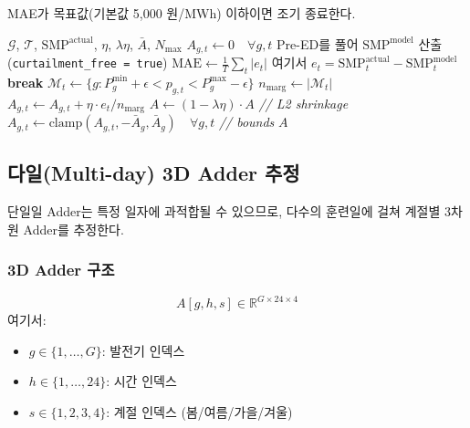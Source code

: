 \documentclass[11pt, a4paper]{article}
\begin{document}
MAE가 목표값(기본값 5,000 원/MWh) 이하이면 조기 종료한다.

\begin{algorithm}[H]
\caption{단일일 Price Adder 추정}\label{alg:single_adder}
\begin{algorithmic}[1]
\REQUIRE $\mathcal{G}$, $\mathcal{T}$, $\text{SMP}^{\text{actual}}$, $\eta$, $\lambda\eta$, $\bar{A}$, $N_{\max}$
\STATE $A_{g,t} \leftarrow 0 \quad \forall g, t$
    \STATE Pre-ED를 풀어 $\text{SMP}^{\text{model}}$ 산출 (\texttt{curtailment\_free = true})
    \STATE $\text{MAE} \leftarrow \frac{1}{T}\sum_t |e_t|$ \quad 여기서 $e_t = \text{SMP}_t^{\text{actual}} - \text{SMP}_t^{\text{model}}$
        \STATE \textbf{break}
    \ENDIF
        \STATE $\mathcal{M}_t \leftarrow \{g : P_g^{\min} + \epsilon < p_{g,t} < P_g^{\max} - \epsilon\}$
        \STATE $n_{\text{marg}} \leftarrow |\mathcal{M}_t|$
                \STATE $A_{g,t} \leftarrow A_{g,t} + \eta \cdot e_t / n_{\text{marg}}$
            \ENDFOR
        \ENDIF
    \ENDFOR
    \STATE $A \leftarrow (1 - \lambda\eta) \cdot A$ \hfill \textit{// L2 shrinkage}
    \STATE $A_{g,t} \leftarrow \text{clamp}(A_{g,t}, -\bar{A}_g, \bar{A}_g) \quad \forall g, t$ \hfill \textit{// bounds}
\ENDFOR
\RETURN $A$
\end{algorithmic}
\end{algorithm}

\subsection{다일(Multi-day) 3D Adder 추정}\label{sec:multi_day_adder}

단일일 Adder는 특정 일자에 과적합될 수 있으므로,
다수의 훈련일에 걸쳐 계절별 3차원 Adder를 추정한다.

\subsubsection{3D Adder 구조}

\begin{equation}\label{eq:adder_3d}
    \boxed{A[g, h, s] \in \mathbb{R}^{G \times 24 \times 4}}
\end{equation}
여기서:
\begin{itemize}[noitemsep]
    \item $g \in \{1, \ldots, G\}$: 발전기 인덱스
    \item $h \in \{1, \ldots, 24\}$: 시간 인덱스
    \item $s \in \{1, 2, 3, 4\}$: 계절 인덱스 (봄/여름/가을/겨울)
\end{itemize}
\end{document}
